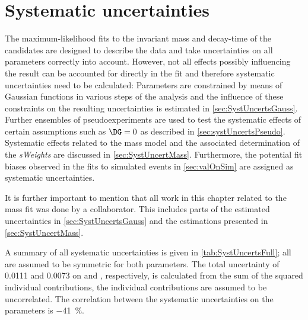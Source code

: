 \chapter{Systematic uncertainties}
\label{ch:systeamticUncerts}

\linespread{1.08}\selectfont
The maximum-likelihood fits to the invariant mass and decay-time of the \mbox{\BdToDpi} candidates are designed to describe the data and take uncertainties on all parameters correctly into account.
However, not all effects possibly influencing the result can be accounted for directly in the fit and therefore systematic uncertainties need to be calculated:
Parameters are constrained by means of Gaussian functions in various steps of the analysis and the influence of these constraints on the resulting uncertainties is estimated in \cref{sec:SystUncertsGauss}.
Further ensembles of pseudoexperiments are used to test the systematic effects of certain assumptions such as $\DG=0$  as described in \cref{sec:systUncertsPseudo}.
Systematic effects related to the mass model and the associated determination of the \emph{sWeights} are discussed in \cref{sec:SystUncertMass}.
Furthermore, the potential fit biases observed in the fits to simulated events in \cref{sec:valOnSim} are assigned as systematic uncertainties.

It is further important to mention that all work in this chapter related to the mass fit was done by a collaborator.
This includes parts of the estimated uncertainties in \cref{sec:SystUncertsGauss} and the estimations presented in \cref{sec:SystUncertMass}.

A summary of all systematic uncertainties is given in \cref{tab:SystUncertsFull}; all are assumed to be symmetric for both \CP parameters.
The total uncertainty of \num{0.0111} and \num{0.0073} on \Sf and \Sfbar, respectively, is calculated from the sum of the squared individual contributions, \ie the individual contributions are assumed to be uncorrelated.
The correlation between the systematic uncertainties on the \CP parameters is \SI{-41}{\percent}.

